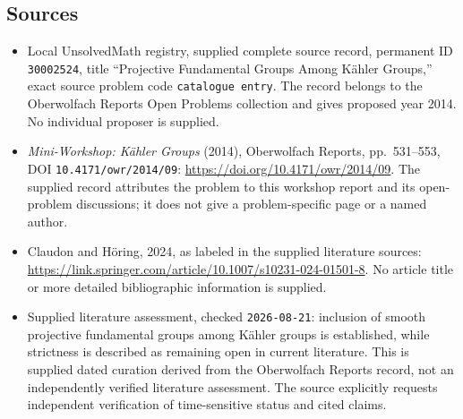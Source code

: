 \documentclass[11pt]{article}
\begin{document}
\subsection{Sources}
\begin{itemize}
\item Local UnsolvedMath registry, supplied complete source record, permanent ID \texttt{30002524}, title ``Projective Fundamental Groups Among Kähler Groups,'' exact source problem code \texttt{catalogue entry}. The record belongs to the Oberwolfach Reports Open Problems collection and gives proposed year 2014. No individual proposer is supplied.
\item \emph{Mini-Workshop: Kähler Groups} (2014), Oberwolfach Reports, pp.\ 531--553, DOI \texttt{10.4171/owr/2014/09}: \url{https://doi.org/10.4171/owr/2014/09}. The supplied record attributes the problem to this workshop report and its open-problem discussions; it does not give a problem-specific page or a named author.
\item Claudon and Höring, 2024, as labeled in the supplied literature sources: \url{https://link.springer.com/article/10.1007/s10231-024-01501-8}. No article title or more detailed bibliographic information is supplied.
\item Supplied literature assessment, checked \texttt{2026-08-21}: inclusion of smooth projective fundamental groups among Kähler groups is established, while strictness is described as remaining open in current literature. This is supplied dated curation derived from the Oberwolfach Reports record, not an independently verified literature assessment. The source explicitly requests independent verification of time-sensitive status and cited claims.
\end{itemize}
\end{document}
